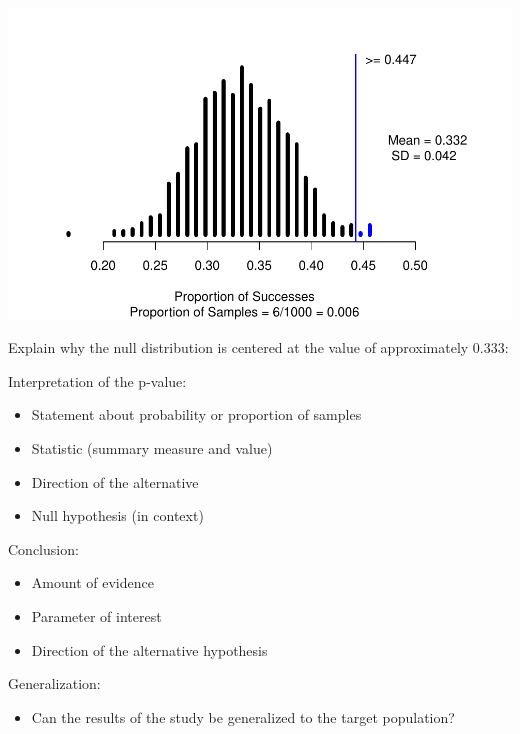 \documentclass[
]{report}
\providecommand{\tightlist}{%
  \setlength{\itemsep}{0pt}\setlength{\parskip}{0pt}}
\begin{document}
\begin{center}\includegraphics[width=0.7\linewidth]{06-LN06-1cat_simulation_files/figure-latex/unnamed-chunk-2-1} \end{center}

Explain why the null distribution is centered at the value of approximately 0.333:

\vspace{0.5in}

Interpretation of the p-value:

\begin{itemize}
\item
  Statement about probability or proportion of samples
\item
  Statistic (summary measure and value)
\item
  Direction of the alternative
\item
  Null hypothesis (in context)
\end{itemize}

\vspace{0.8in}

Conclusion:

\begin{itemize}
\item
  Amount of evidence
\item
  Parameter of interest
\item
  Direction of the alternative hypothesis
\end{itemize}

\vspace{0.6in}

Generalization:

\begin{itemize}
\tightlist
\item
  Can the results of the study be generalized to the target population?
\end{itemize}

\vspace{0.4in}
\end{document}
